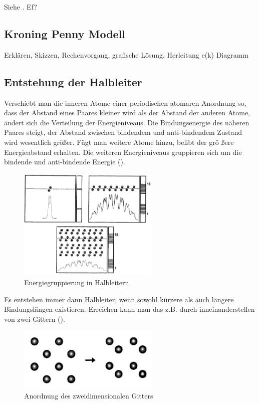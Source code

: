 \documentclass{article}
\begin{document}
Siehe . Ef?

\subsection{Kroning Penny Modell }\label{k2:kroningpenny}
Erkl\"aren, Skizzen, Rechenvorgang, grafische L\"osung, Herleitung e(k) Diagramm

\subsection{Entstehung der Halbleiter }\label{k2:entstehungHalbleiter}

Verschiebt man die inneren Atome einer periodischen atomaren Anordnung so, dass der Abstand eines Paares kleiner wird als der Abstand der anderen Atome, \"andert sich die Verteilung der Energieniveaus. Die Bindungsenergie des n\"aheren Paares steigt, der Abstand zwischen bindendem und anti-bindendem Zustand wird wesentlich gr\"o{\ss}er. F\"ugt man weitere Atome hinzu, belibt der gr\"o{
\ss}ere Energieabstand erhalten. Die weiteren Energieniveaus gruppieren sich um die bindende und anti-bindende Energie ().

\begin{figure}[h]
        \centering
        \includegraphics[width=0.6\textwidth]{fig/energieHalbleiter}
        \caption{Energiegruppierung in Halbleitern}
        \label{fig:energieHalbleiter}
\end{figure}

Es entstehen immer dann Halbleiter, wenn sowohl k\"urzere als auch l\"angere Bindungsl\"angen existieren. Erreichen kann man das z.B. durch inneinanderstellen von zwei Gittern ().

\begin{figure}[h]
        \centering
        \includegraphics[width=0.6\textwidth]{fig/gitterstrukturen}
        \caption{Anordnung des zweidimensionalen Gitters}
        \label{fig:gitterstrukturen}
\end{figure}
\end{document}
